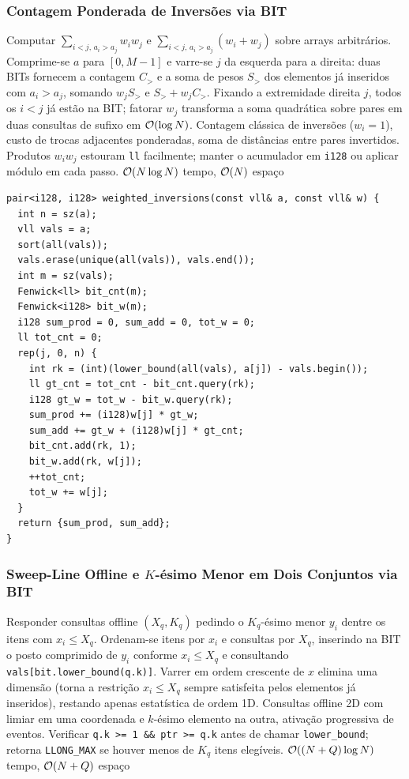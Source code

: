 \subsubsection{Contagem Ponderada de Inversões via BIT}
\algobox
  {Computar $\sum_{i < j,\, a_i > a_j} w_i w_j$ e $\sum_{i < j,\, a_i > a_j} (w_i + w_j)$ sobre arrays arbitrários.}
  {Comprime-se $a$ para $[0, M-1]$ e varre-se $j$ da esquerda para a direita: duas BITs fornecem a contagem $C_>$ e a soma de pesos $S_>$ dos elementos já inseridos com $a_i > a_j$, somando $w_j S_>$ e $S_> + w_j C_>$.}
  {Fixando a extremidade direita $j$, todos os $i < j$ já estão na BIT; fatorar $w_j$ transforma a soma quadrática sobre pares em duas consultas de sufixo em $\mathcal{O}(\log N)$.}
  {Contagem clássica de inversões ($w_i = 1$), custo de trocas adjacentes ponderadas, soma de distâncias entre pares invertidos.}
  {Produtos $w_i w_j$ estouram \texttt{ll} facilmente; manter o acumulador em \texttt{i128} ou aplicar módulo em cada passo.}
  {$\mathcal{O}(N \log N)$ tempo, $\mathcal{O}(N)$ espaço}

\begin{lstlisting}
pair<i128, i128> weighted_inversions(const vll& a, const vll& w) {
  int n = sz(a);
  vll vals = a;
  sort(all(vals));
  vals.erase(unique(all(vals)), vals.end());
  int m = sz(vals);
  Fenwick<ll> bit_cnt(m);
  Fenwick<i128> bit_w(m);
  i128 sum_prod = 0, sum_add = 0, tot_w = 0;
  ll tot_cnt = 0;
  rep(j, 0, n) {
    int rk = (int)(lower_bound(all(vals), a[j]) - vals.begin());
    ll gt_cnt = tot_cnt - bit_cnt.query(rk);
    i128 gt_w = tot_w - bit_w.query(rk);
    sum_prod += (i128)w[j] * gt_w;
    sum_add += gt_w + (i128)w[j] * gt_cnt;
    bit_cnt.add(rk, 1);
    bit_w.add(rk, w[j]);
    ++tot_cnt;
    tot_w += w[j];
  }
  return {sum_prod, sum_add};
}
\end{lstlisting}

\subsubsection{Sweep-Line Offline e $K$-ésimo Menor em Dois Conjuntos via BIT}
\algobox
  {Responder consultas offline $(X_q, K_q)$ pedindo o $K_q$-ésimo menor $y_i$ dentre os itens com $x_i \le X_q$.}
  {Ordenam-se itens por $x_i$ e consultas por $X_q$, inserindo na BIT o posto comprimido de $y_i$ conforme $x_i \le X_q$ e consultando \texttt{vals[bit.lower\_bound(q.k)]}.}
  {Varrer em ordem crescente de $x$ elimina uma dimensão (torna a restrição $x_i \le X_q$ sempre satisfeita pelos elementos já inseridos), restando apenas estatística de ordem 1D.}
  {Consultas offline 2D com limiar em uma coordenada e $k$-ésimo elemento na outra, ativação progressiva de eventos.}
  {Verificar \texttt{q.k >= 1 \&\& ptr >= q.k} antes de chamar \texttt{lower\_bound}; retorna \texttt{LLONG\_MAX} se houver menos de $K_q$ itens elegíveis.}
  {$\mathcal{O}((N + Q) \log N)$ tempo, $\mathcal{O}(N + Q)$ espaço}


